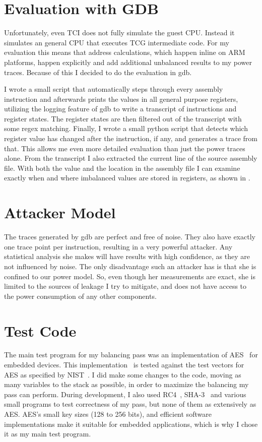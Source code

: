 \section{Evaluation with GDB}
Unfortunately, even TCI does not fully simulate the guest CPU.
Instead it simulates an general CPU that executes TCG intermediate code.
For my evaluation this means that address calculations, which happen inline on ARM platforms, happen explicitly and add additional unbalanced results to my power traces.
Because of this I decided to do the evaluation in gdb.

I wrote a small script that automatically steps through every assembly instruction and afterwards prints the values in all general purpose registers, utilizing the logging feature of gdb to write a transcript of instructions and register states.
The register states are then filtered out of the transcript with some regex matching.
Finally, I wrote a small python script that detects which register value has changed after the instruction, if any, and generates a trace from that.
This allows me even more detailed evaluation than just the power traces alone.
From the transcript I also extracted the current line of the source assembly file.
With both the value and the location in the assembly file I can examine exactly when and where imbalanced values are stored in registers, as shown in .

\section{Attacker Model}
The traces generated by gdb are perfect and free of noise.
They also have exactly one trace point per instruction, resulting in a very powerful attacker.
Any statistical analysis she makes will have results with high confidence, as they are not influenced by noise.
The only disadvantage such an attacker has is that she is confined to our power model.
So, even though her measurements are exact, she is limited to the sources of leakage I try to mitigate, and does not have access to the power consumption of any other components.

\section{Test Code}
The main test program for my balancing pass was an implementation of AES~\cite{daemen2013design} for embedded devices.
This implementation~\cite{tinyaes} is tested against the test vectors for AES as specified by NIST~\cite{dworkin2001recommendation}.
I did make some changes to the code, moving as many variables to the stack as possible, in order to maximize the balancing my pass can perform.
During development, I also used RC4~\cite{rc4}, SHA-3~\cite{bertoni2013keccak} and various small programs to test correctness of my pass, but none of them as extensively as AES.
AES's small key sizes (128 to 256 bits), and efficient software implementations make it suitable for embedded applications, which is why I chose it as my main test program.

